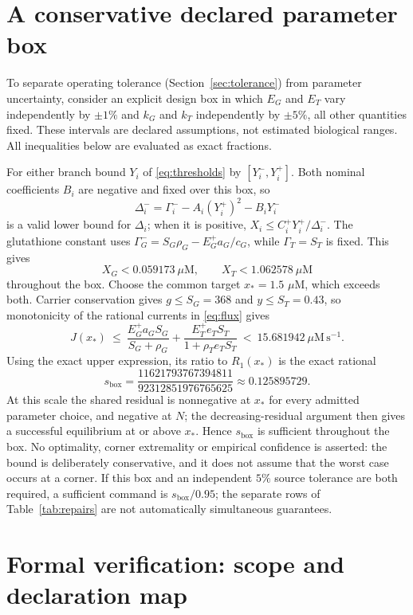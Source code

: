 \documentclass[11pt,a4paper]{article}
\theoremstyle{plain}
\theoremstyle{definition}
\theoremstyle{remark}
\newcommand{\uM}{\ensuremath{\mu\mathrm{M}}}
\newcommand{\fluxunit}{\ensuremath{\mu\mathrm{M}\,\mathrm{s}^{-1}}}
\newcommand{\Gm}{\Gamma}
\begin{document}
\section{A conservative declared parameter box}\label{app:box}

To separate operating tolerance (Section~\ref{sec:tolerance}) from parameter
uncertainty, consider an explicit design box in which $E_G$ and $E_T$ vary
independently by $\pm1\%$ and $k_G$ and $k_T$ independently by $\pm5\%$, all other
quantities fixed. These intervals are declared assumptions, not estimated
biological ranges. All inequalities below are evaluated as exact fractions.

For either branch bound $Y_i$ of \eqref{eq:thresholds} by $[Y_i^-,Y_i^+]$. Both
nominal coefficients $B_i$ are negative and fixed over this box, so
\[
  \Delta_i^-=\Gm_i^--A_i(Y_i^+)^2-B_iY_i^-
\]
is a valid lower bound for $\Delta_i$; when it is positive,
$X_i\le C_i^+Y_i^+/\Delta_i^-$. The glutathione constant uses
$\Gm_G^-=S_G\rho_G-E_G^+a_G/c_G$, while $\Gm_T=S_T$ is fixed. This gives
\[
  X_G<0.059173\ \uM,\qquad X_T<1.062578\ \uM
\]
throughout the box. Choose the common target $x_*=1.5$ \uM, which exceeds both.
Carrier conservation gives $g\le S_G=368$ and $y\le S_T=0.43$, so monotonicity of
the rational currents in \eqref{eq:flux} gives
\[
  J(x_*)\ \le\ \frac{E_G^+a_GS_G}{S_G+\rho_G}+\frac{E_T^+e_TS_T}{1+\rho_Te_TS_T}
  \ <\ 15.681942\ \fluxunit .
\]
Using the exact upper expression, its ratio to $R_1(x_*)$ is the exact rational
\begin{equation}\label{eq:sbox}
  s_{\mathrm{box}}=\frac{11621793767394811}{92312851976765625}\approx0.125895729 .
\end{equation}
At this scale the shared residual is nonnegative at $x_*$ for every admitted
parameter choice, and negative at $N$; the decreasing-residual argument then gives
a successful equilibrium at or above $x_*$. Hence $s_{\mathrm{box}}$ is sufficient
throughout the box. No optimality, corner extremality or empirical confidence is
asserted: the bound is deliberately conservative, and it does not assume that the
worst case occurs at a corner. If this box and an independent $5\%$ source
tolerance are both required, a sufficient command is $s_{\mathrm{box}}/0.95$; the
separate rows of Table~\ref{tab:repairs} are not automatically simultaneous
guarantees.

\section{Formal verification: scope and declaration map}\label{app:formal}
\end{document}
